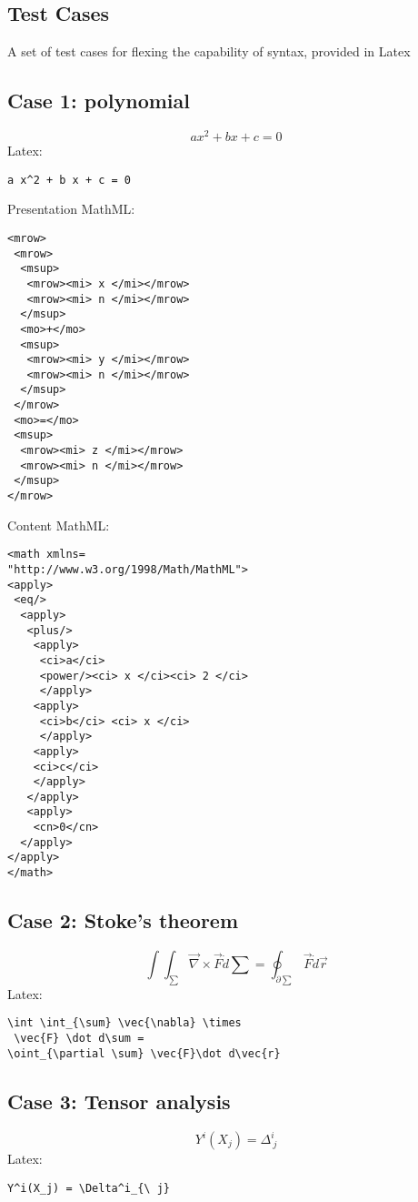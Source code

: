 \documentclass{article}
\begin{document}
\begin{multicols}{2}
\section{Test Cases}
A set of test cases for flexing the capability of syntax, provided in Latex

\subsection{Case 1: polynomial}

\begin{equation}
a x^2 + b x + c = 0
\label{eq:polynomial_case1}
\end{equation}
Latex: 
\begin{verbatim}
a x^2 + b x + c = 0
\end{verbatim}

Presentation MathML:
\begin{verbatim}
<mrow>
 <mrow>
  <msup>
   <mrow><mi> x </mi></mrow>
   <mrow><mi> n </mi></mrow>
  </msup>
  <mo>+</mo>
  <msup>
   <mrow><mi> y </mi></mrow>
   <mrow><mi> n </mi></mrow>
  </msup>
 </mrow>
 <mo>=</mo>
 <msup>
  <mrow><mi> z </mi></mrow>
  <mrow><mi> n </mi></mrow>
 </msup>
</mrow>
\end{verbatim}

Content MathML:
\begin{verbatim}
<math xmlns=
"http://www.w3.org/1998/Math/MathML">
<apply>
 <eq/>
  <apply>
   <plus/>
    <apply>
     <ci>a</ci> 
     <power/><ci> x </ci><ci> 2 </ci>
     </apply>
    <apply>
     <ci>b</ci> <ci> x </ci>                    
     </apply>
    <apply>
    <ci>c</ci>                                 
    </apply>
   </apply>
   <apply>
    <cn>0</cn>
  </apply>
</apply>
</math>
\end{verbatim}

\subsection{Case 2: Stoke's theorem}
\begin{equation}
\int \int_{\sum} \vec{\nabla} \times \vec{F} \dot d\sum = \oint_{\partial \sum} \vec{F}\dot d\vec{r}
\label{eq:stokes_case2}
\end{equation}
Latex:
\begin{verbatim}
\int \int_{\sum} \vec{\nabla} \times
 \vec{F} \dot d\sum = 
\oint_{\partial \sum} \vec{F}\dot d\vec{r}
\end{verbatim}

\subsection{Case 3: Tensor analysis}
\begin{equation}
Y^i(X_j) = \Delta^i_{\ j}
\end{equation}
Latex: 
\begin{verbatim}
Y^i(X_j) = \Delta^i_{\ j}
\end{verbatim}


\end{multicols}
\end{document}
